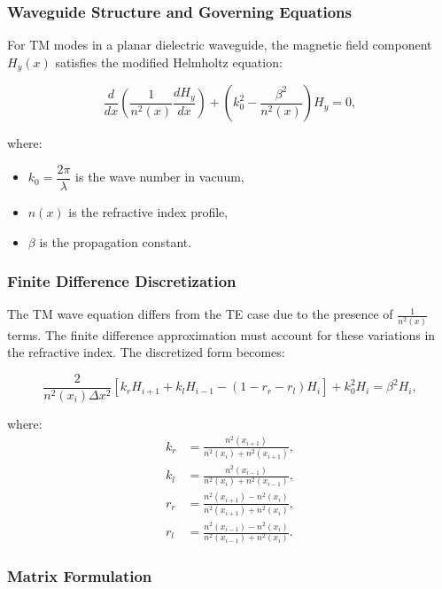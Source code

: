 \documentclass{article}
\begin{document}
\subsubsection{Waveguide Structure and Governing Equations}

For TM modes in a planar dielectric waveguide, the magnetic field component $H_y(x)$ satisfies the modified Helmholtz equation:

\begin{equation}
\frac{d}{dx}\left(\frac{1}{n^2(x)}\frac{dH_y}{dx}\right) + \left(k_0^2 - \frac{\beta^2}{n^2(x)}\right)H_y = 0,
\end{equation}

where:
\begin{itemize}
\item $k_0 = \dfrac{2\pi}{\lambda}$ is the wave number in vacuum,
\item $n(x)$ is the refractive index profile,
\item $\beta$ is the propagation constant.
\end{itemize}

\subsubsection{Finite Difference Discretization}

The TM wave equation differs from the TE case due to the presence of $\frac{1}{n^2(x)}$ terms. The finite difference approximation must account for these variations in the refractive index. The discretized form becomes:

\begin{equation}
\frac{2}{n^2(x_i)\Delta x^2}\left[k_r H_{i+1} + k_l H_{i-1} - (1-r_r-r_l)H_i\right] + k_0^2 H_i = \beta^2 H_i,
\end{equation}

where:
\begin{align}
k_r &= \frac{n^2(x_{i+1})}{n^2(x_i) + n^2(x_{i+1})}, \\
k_l &= \frac{n^2(x_{i-1})}{n^2(x_i) + n^2(x_{i-1})}, \\
r_r &= \frac{n^2(x_{i+1}) - n^2(x_i)}{n^2(x_{i+1}) + n^2(x_i)}, \\
r_l &= \frac{n^2(x_{i-1}) - n^2(x_i)}{n^2(x_{i-1}) + n^2(x_i)}.
\end{align}

\subsubsection{Matrix Formulation}
\end{document}
